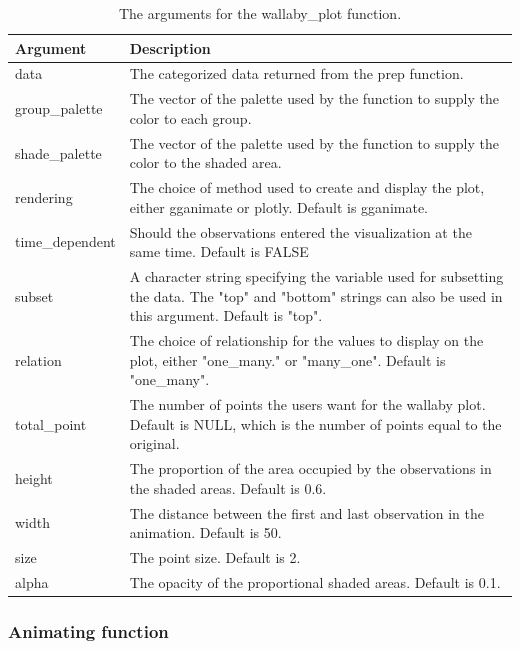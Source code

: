 \begin{table}

\caption{\label{tab:unnamed-chunk-8}The arguments for the wallaby\_plot function.}
\centering
\begin{tabular}[t]{l|>{\raggedright\arraybackslash}p{30em}}
\hline
Argument & Description\\
\hline
data & The categorized data returned from the prep function.\\
\hline
group\_palette & The vector of the palette used by the function to supply the color to each group.\\
\hline
shade\_palette & The vector of the palette used by the function to supply the color to the shaded area.\\
\hline
rendering & The choice of method used to create and display the plot, either gganimate or plotly. Default is gganimate.\\
\hline
time\_dependent & Should the observations entered the visualization at the same time. Default is FALSE\\
\hline
subset & A character string specifying the variable used for subsetting the data. The "top" and "bottom" strings can also be used in this argument. Default is "top".\\
\hline
relation & The choice of relationship for the values to display on the plot, either "one\_many." or "many\_one". Default is "one\_many".\\
\hline
total\_point & The number of points the users want for the wallaby plot. Default is NULL, which is the number of points equal to the original.\\
\hline
height & The proportion of the area occupied by the observations in the shaded areas. Default is 0.6.\\
\hline
width & The distance between the first and last observation in the animation. Default is 50.\\
\hline
size & The point size. Default is 2.\\
\hline
alpha & The opacity of the proportional shaded areas. Default is 0.1.\\
\hline
\end{tabular}
\end{table}

\hypertarget{animating-function}{%
\subsubsection{Animating function}\label{animating-function}}


